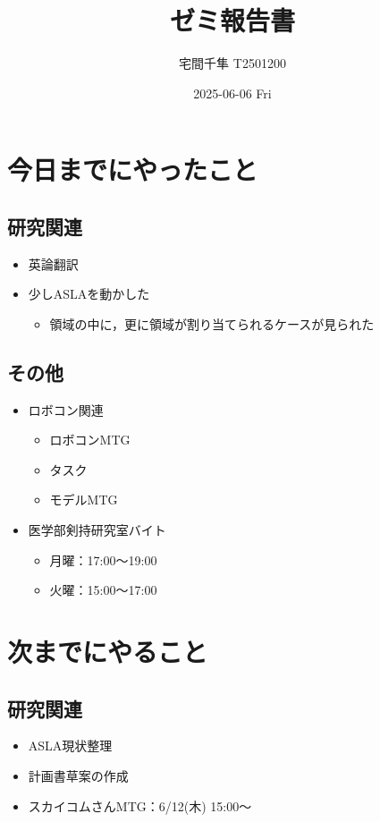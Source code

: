 \documentclass[uplatex, onecolumn, 10pt]{jsarticle}
\begin{document}
\title{\vspace{-40mm}\bf{\LARGE{ゼミ報告書}}}
\author{\vspace{-40mm}宅間千隼 T2501200}
\date{2025-06-06 Fri}
\maketitle


\section{今日までにやったこと}

\subsection*{研究関連} 
\begin{itemize}
	\item 英論翻訳
	\item 少しASLAを動かした
	\begin{itemize}
		\item 領域の中に，更に領域が割り当てられるケースが見られた
	\end{itemize}
\end{itemize}

\subsection*{その他}
\begin{itemize}
	\item ロボコン関連
	\begin{itemize}
		\item ロボコンMTG
		\item タスク
		\item モデルMTG
	\end{itemize}
	\item 医学部剣持研究室バイト
	\begin{itemize}
		\item 月曜：17:00～19:00
		\item 火曜：15:00～17:00
	\end{itemize}
\end{itemize}


\section{次までにやること}

\subsection*{研究関連}
\begin{itemize}
	\item ASLA現状整理
	\item 計画書草案の作成
	\item スカイコムさんMTG：6/12(木) 15:00～
\end{itemize}
\end{document}
